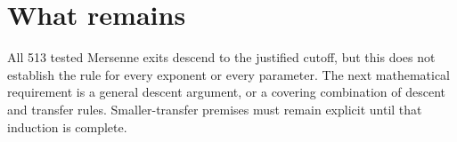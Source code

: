 \documentclass[10pt]{article}
\begin{document}
\section*{What remains}
All 513 tested Mersenne exits descend to the justified cutoff, but this does not establish the rule for every exponent or every parameter. The next mathematical requirement is a general descent argument, or a covering combination of descent and transfer rules. Smaller-transfer premises must remain explicit until that induction is complete.
\end{document}
